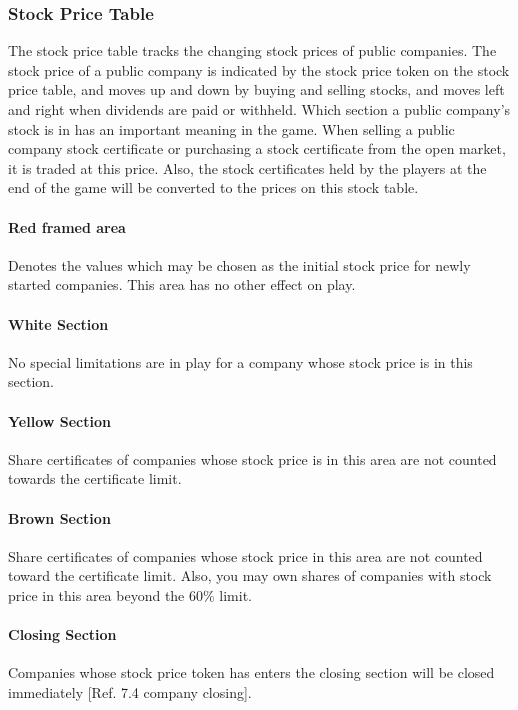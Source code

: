 \documentclass{article}
\begin{document}
\begin{CJK}{UTF8}{min}
\begin{multicols}{2}
\subsubsection{Stock Price Table}
The stock price table tracks the changing stock prices of public
companies. The stock price of a public company is indicated by the
stock price token on the stock price table, and moves up and down by
buying and selling stocks, and moves left and right when dividends are
paid or withheld. Which section a public company's stock is in has an
important meaning in the game. When selling a public company stock
certificate or purchasing a stock certificate from the open market, it
is traded at this price. Also, the stock certificates held by the
players at the end of the game will be converted to the prices on this
stock table.


\paragraph{Red framed area}
Denotes the values which may be chosen as the initial stock price for
newly started companies. This area has no other effect on play.


\paragraph{White Section}
No special limitations are in play for a company whose stock price is
in this section.


\paragraph{Yellow Section}
Share certificates of companies whose stock price is in this area
are not counted towards the certificate limit.


\paragraph{Brown Section}
Share certificates of companies whose stock price in this area
are not counted toward the certificate limit. Also, you
may own shares of companies with stock price in this area beyond the
60\% limit.

\paragraph{Closing Section}
Companies whose stock price token has enters the closing
section will be closed immediately [Ref. 7.4 company closing].



\end{multicols}
\end{CJK}
\end{document}
